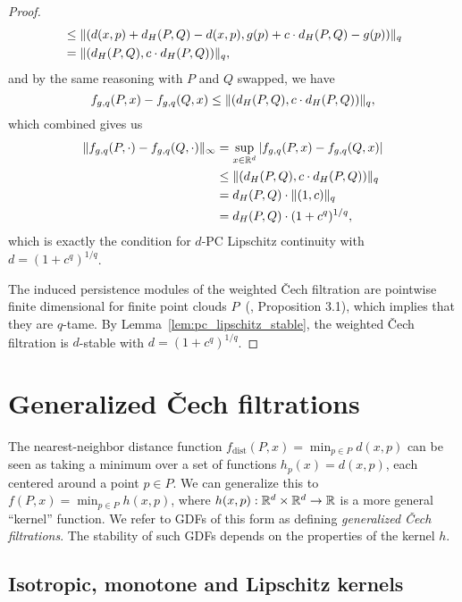 \begin{proof}
\begin{align}
        & \leq \lVert(d(x, p) + d_H(P, Q) - d(x, p), g(p) + c \cdot d_H(P, Q) - g(p))\rVert_q \\
        & = \lVert(d_H(P, Q), c \cdot d_H(P, Q))\rVert_q,
    \end{align}
    and by the same reasoning with $P$ and $Q$ swapped, we have
    \begin{equation}
        f_{g, q}(P, x) - f_{g, q}(Q, x) \leq \lVert(d_H(P, Q), c \cdot d_H(P, Q))\rVert_q,
    \end{equation}
    which combined gives us
    \begin{align}
        \lVert f_{g, q}(P, \cdot) - f_{g, q}(Q, \cdot)\rVert_\infty
        & = \sup_{x \in \mathbb{R}^d} |f_{g, q}(P, x) - f_{g, q}(Q, x)| \\
        & \leq \lVert(d_H(P, Q), c \cdot d_H(P, Q))\rVert_q \\
        & = d_H(P, Q) \cdot \lVert(1, c)\rVert_q \\
        & = d_H(P, Q) \cdot (1 + c^q)^{1/q},
    \end{align}
    which is exactly the condition for $d$-PC Lipschitz continuity with $d = (1 + c^q)^{1/q}$.

    The induced persistence modules of the weighted \v{C}ech filtration are
    pointwise finite dimensional for finite point clouds
    $P$~(\cite{anai2020dtm}, Proposition 3.1), which implies
    that they are $q$-tame. By Lemma~\ref{lem:pc_lipschitz_stable}, the
    weighted \v{C}ech filtration is $d$-stable with $d = (1 + c^q)^{1/q}$.
\end{proof}

\section{Generalized \v{C}ech filtrations}

The nearest-neighbor distance function
$f_{\mathrm{dist}}(P, x) = \min_{p \in P} d(x, p)$ can be
seen as taking a minimum over a set of functions $h_p(x) = d(x, p)$, each
centered around a point $p \in P$. We can generalize this to
$f(P, x) = \min_{p \in P} h(x, p)$, where $h(x, p) : \mathbb{R}^d \times \mathbb{R}^d \to \mathbb{R}$ is
a more general ``kernel'' function. We refer to GDFs of this form as defining
\emph{generalized \v{C}ech filtrations}. The stability of such GDFs depends on
the properties of the kernel $h$.

\subsection{Isotropic, monotone and Lipschitz kernels}

